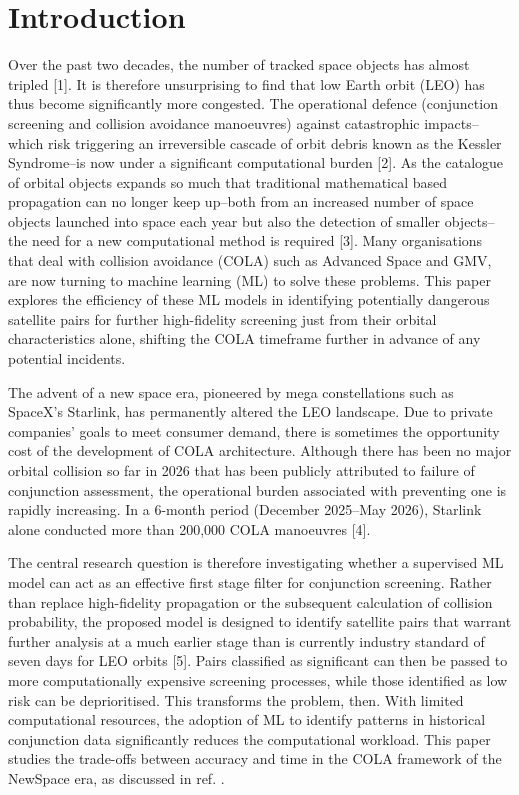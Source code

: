 \documentclass[letterpaper,11pt,leqno]{article}
\begin{document}
\section{Introduction}\label{s:introduction}
 
Over the past two decades, the number of tracked space objects has almost tripled [1]. It is therefore unsurprising to find that low Earth orbit (LEO) has thus become significantly more congested. The operational defence (conjunction screening and collision avoidance manoeuvres) against catastrophic impacts--which risk triggering an irreversible cascade of orbit debris known as the Kessler Syndrome--is now under a significant computational burden [2]. As the catalogue of orbital objects expands so much that traditional mathematical based propagation can no longer keep up--both from an increased number of space objects launched into space each year but also the detection of smaller objects--the need for a new computational method is required [3]. Many organisations that deal with collision avoidance (COLA) such as Advanced Space and GMV, are now turning to machine learning (ML) to solve these problems. This paper explores the efficiency of these ML models in identifying potentially dangerous satellite pairs for further high-fidelity screening just from their orbital characteristics alone, shifting the COLA timeframe further in advance of any potential incidents.

The advent of a new space era, pioneered by mega constellations such as SpaceX's Starlink, has permanently altered the LEO landscape. Due to private companies' goals to meet consumer demand, there is sometimes the opportunity cost of the development of COLA architecture. Although there has been no major orbital collision so far in 2026 that has been publicly attributed to failure of conjunction assessment, the operational burden associated with preventing one is rapidly increasing. In a 6-month period (December 2025--May 2026), Starlink alone conducted more than 200,000 COLA manoeuvres [4].

The central research question is therefore investigating whether a supervised ML model can act as an effective first stage filter for conjunction screening. Rather than replace high-fidelity propagation or the subsequent calculation of collision probability, the proposed model is designed to identify satellite pairs that warrant further analysis at a much earlier stage than is currently industry standard of seven days for LEO orbits [5]. Pairs classified as significant can then be passed to more computationally expensive screening processes, while those identified as low risk can be deprioritised. This transforms the problem, then. With limited computational resources, the adoption of ML to identify patterns in historical conjunction data significantly reduces the computational workload. This paper studies the trade-offs between accuracy and time in the COLA framework of the NewSpace era, as discussed in ref. \cite{Manfletti2023}.
\end{document}

